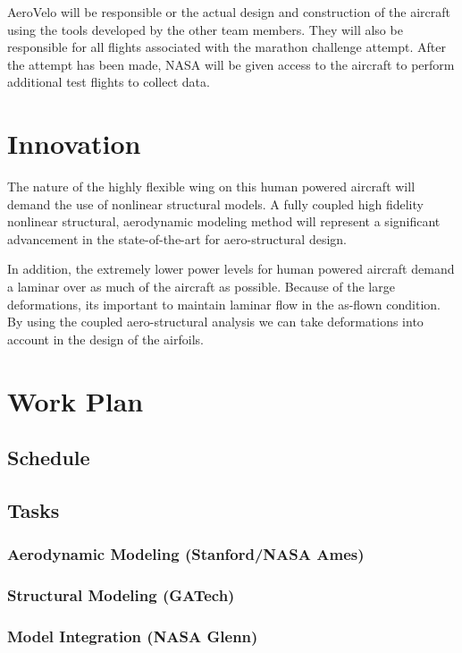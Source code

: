 \documentclass[]{aiaa-tc}
\begin{document}
    AeroVelo will be responsible or the actual design and construction of the aircraft using the tools developed 
    by the other team members. They will also be responsible for all flights associated with 
    the marathon challenge attempt. After the attempt has been made, NASA will be given access to 
    the aircraft to perform additional test flights to collect data. 

    


  \section{Innovation}
    The nature of the highly flexible wing on this human powered aircraft will demand the use 
    of nonlinear structural models. A fully coupled high fidelity nonlinear structural, aerodynamic modeling method 
    will represent a significant advancement in the state­-of-­the-­art for aero­-structural design. 

    In addition, the extremely lower power levels for human powered aircraft demand a laminar over as much of 
    the aircraft as possible. Because of the large deformations, its important to maintain laminar flow in the 
    as-flown condition. By using the coupled aero-structural analysis we can take deformations into account in the design 
    of the airfoils. 

  \section{Work Plan}
    \subsection{Schedule}
    \subsection{Tasks}
        \subsubsection{Aerodynamic Modeling (Stanford/NASA Ames)}
        \subsubsection{Structural Modeling (GATech)}
        \subsubsection{Model Integration (NASA Glenn)}
\end{document}
